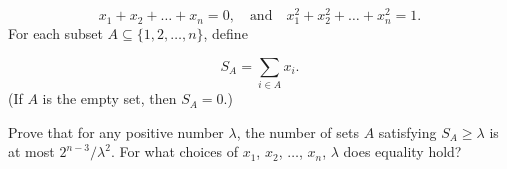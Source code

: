 \begin{enumerate}
 \[x_1 + x_2 + \dots + x_n = 0, \quad \text{and} \quad x_1^2 + x_2^2 + \dots + x_n^2 = 1.\]
For each subset $A \subseteq \{1, 2, \dots, n\}$, define

 \[S_A = \sum_{i \in A} x_i.\]
(If $A$ is the empty set, then $S_A = 0$.)


 Prove that for any positive number $\lambda$, the number of sets $A$ satisfying $S_A \ge \lambda$ is at most $2^{n - 3}/\lambda^2$.  For what choices of $x_1$, $x_2$, $\dots$, $x_n$, $\lambda$ does equality hold?


 

\end{enumerate}